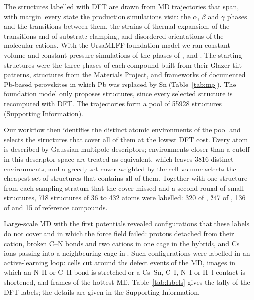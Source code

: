 {\changedcolor
The structures labelled with DFT are drawn from MD trajectories that span, with margin, every state the production
simulations visit: the $\alpha$, $\beta$ and $\gamma$ phases and the transitions between them, the strains of thermal
expansion, of the transitions and of substrate clamping, and disordered orientations of the molecular cations. With
the UrsaMLFF foundation model we ran constant-volume and constant-pressure simulations of the phases of \CsSnI{},
\MASnI{} and \FASnI{}. The starting structures were the three phases of each compound built from their Glazer tilt
patterns,\cite{Glazer1972} structures from the Materials Project,\cite{mp2013} and frameworks of documented Pb-based
perovskites in which Pb was replaced by Sn (Table~\ref{tab:mp}). The foundation model only proposes structures, since
every selected structure is recomputed with DFT. The trajectories form a pool of \num{55928} structures (Supporting
Information).

Our workflow then identifies the distinct atomic environments of the pool and selects the structures that cover all
of them at the lowest DFT cost. Every atom is described by Gaussian multipole descriptors;\cite{Lei2019GMP, Lei2022GMP}
environments closer than a cutoff in this descriptor space are treated as equivalent, which leaves 3816 distinct
environments, and a greedy set cover weighted by the cell volume selects the cheapest set of structures that contains
all of them. Together with one structure from each sampling stratum that the cover missed and a second round of small
structures, 718 structures of 36 to 432 atoms were labelled: 320 of \MASnI{}, 247 of \FASnI{}, 136 of \CsSnI{} and 15
of reference compounds.

Large-scale MD with the first potentials revealed configurations that these labels do not cover and in which the
force field failed: protons detached from their cation, broken C--N bonds and two cations in one cage in the hybrids,
and Cs ions passing into a neighbouring cage in \CsSnI{}. Such configurations were labelled in an active-learning
loop: cells cut around the defect events of the MD, images in which an N--H or C--H bond is stretched or a Cs--Sn,
C--I, N--I or H--I contact is shortened, and frames of the hottest MD. Table~\ref{tab:labels} gives the tally of the
DFT labels; the details are given in the Supporting Information.
}

